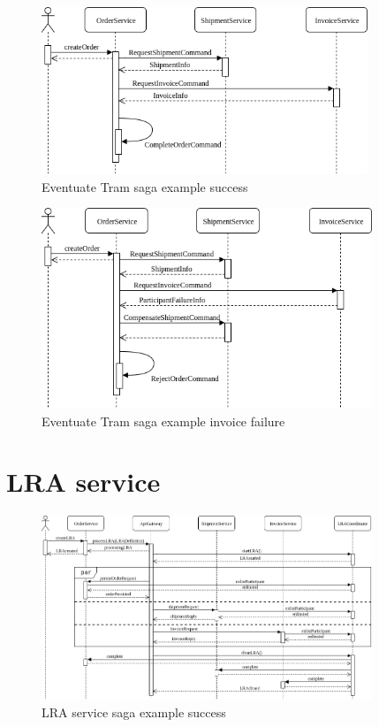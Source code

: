 \documentclass[oneside,
  digital, %
  table,   %
  lof,     %
  lot,     %
]{fithesis3}
\begin{document}
\begin{figure}[h]
    \begin{center}
        \includegraphics[height=50mm]{images/sequence/validSagaTram.png}
    \end{center}
    \caption{Eventuate Tram saga example success}
\end{figure}

\hfill \break

\begin{figure}[h]
    \begin{center}
        \includegraphics[height=60mm]{images/sequence/invoiceFailSagaTram.png}
    \end{center}
    \caption{Eventuate Tram saga example invoice failure}
\end{figure}

\clearpage
\section{LRA service}

\begin{figure}[h]
    \begin{center}
        \includegraphics[height=55mm]{images/sequence/validSagaLRA.png}
    \end{center}
    \caption{LRA service saga example success}
\end{figure}
\end{document}
